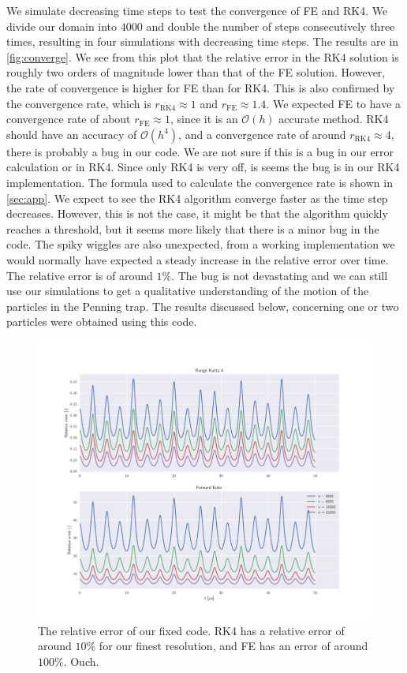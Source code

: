 We simulate decreasing time steps to test the convergence of FE and RK4.
We divide our domain into $4000$ and double the number of steps consecutively three times,
resulting in four simulations with decreasing time steps. The results are in \autoref{fig:converge}.
We see from this plot that the relative error in the RK4 solution is roughly two orders of magnitude lower
than that of the FE solution. However, the rate of convergence is higher for FE than for
RK4. This is also confirmed by the convergence rate, which is $r_{\text{RK4}} \approx 1$ and $r_{\text{FE}} \approx 1.4$. We expected FE to have a convergence rate of about $r_{\text{FE}} \approx 1$, since it is
an $\mathcal{O}(h)$ accurate method. RK4 should have an accuracy of $\mathcal{O}(h^4)$, and a convergence rate of around  $r_{\text{RK4}} \approx 4$, there is probably a bug in our code. We are not sure if
this is a bug in our error calculation or in RK4. Since only RK4 is very off, is seems the bug is
in our RK4 implementation.
The formula used to calculate the convergence rate is shown in \autoref{sec:app}.
We expect to see the RK4 algorithm converge faster as the time step decreases. However, this is not the case, it might be that the algorithm quickly reaches a threshold, but it seems more likely that there
is a minor bug in the code. The spiky wiggles are also unexpected, from a working implementation we
would normally have expected a steady increase in the relative error over time. The relative error is of
around $1\%$. The bug is not devastating and
we can still use our simulations to get a qualitative understanding of the motion of the particles
in the Penning trap. The results discussed below, concerning one or two particles were obtained using
this code.
\begin{figure}
\centering
\includegraphics[scale = 0.5]{../figures/new_convergene.pdf}
\caption{The relative error of our fixed code. RK4 has a relative error of around $10\%$ for our finest resolution, and FE has an error of around $100\%$. Ouch.}
\label{fig:new_conv}
\end{figure}

